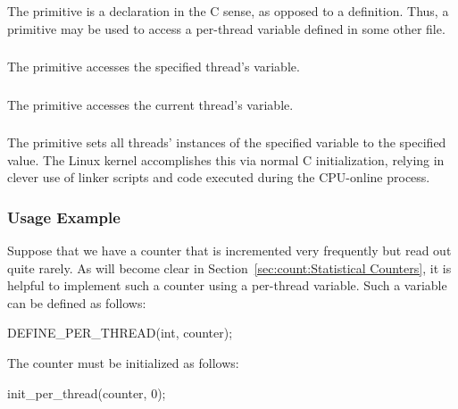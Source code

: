 \subsubsection{}

The  primitive is a declaration in the C sense,
as opposed to a definition.
Thus, a  primitive may be used to access
a per-thread variable defined in some other file.

\subsubsection{}

The  primitive accesses the specified thread's variable.

\subsubsection{}

The  primitive accesses the current thread's variable.

\subsubsection{}

The  primitive sets all threads' instances of
the specified variable to the specified value.
The Linux kernel accomplishes this via normal C initialization,
relying in clever use of linker scripts and code executed during
the CPU-online process.

\subsubsection{Usage Example}

Suppose that we have a counter that is incremented very frequently
but read out quite rarely.
As will become clear in
Section~\ref{sec:count:Statistical Counters},
it is helpful to implement such a counter using a per-thread variable.
Such a variable can be defined as follows:

\begin{VerbatimU}
DEFINE_PER_THREAD(int, counter);
\end{VerbatimU}

The counter must be initialized as follows:

\begin{VerbatimU}
init_per_thread(counter, 0);
\end{VerbatimU}

